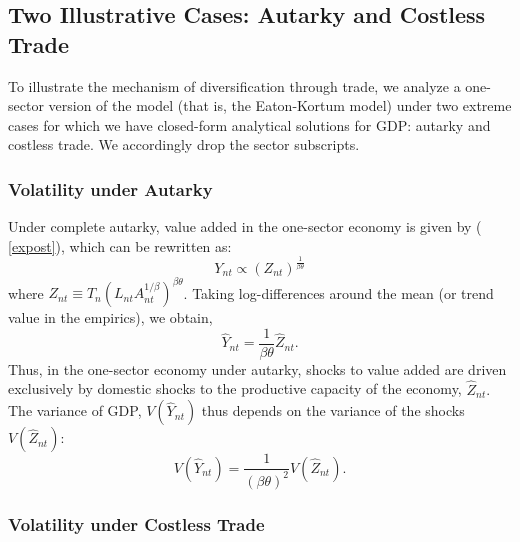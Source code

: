 \documentclass{article}
\begin{document}
\subsection{Two Illustrative Cases: Autarky and Costless Trade}

To illustrate the mechanism of diversification through trade, we analyze a
one-sector version of the model (that is, the Eaton-Kortum model) under two
extreme cases for which we have closed-form analytical solutions for GDP:
autarky and costless trade. We accordingly drop the sector subscripts.

\subsubsection{Volatility under Autarky}

Under complete autarky, value added in the one-sector economy is given by (%
\ref{expost}), which can be rewritten as: 
\begin{equation*}
Y_{nt}\propto \left( Z_{nt}\right) ^{\frac{1}{\beta \theta }} 
\end{equation*}
where $Z_{nt}\equiv T_{n}\left( L_{nt}A_{nt}^{1/\beta }\right)^{\beta\theta
} $. Taking log-differences around the mean (or trend value in the
empirics), we obtain, 
\begin{equation*}
\hat{Y}_{nt}=\frac{1}{\beta \theta }\hat{Z}_{nt}. 
\end{equation*}
Thus, in the one-sector economy under autarky, shocks to value added are
driven exclusively by domestic shocks to the productive capacity of the
economy, $\hat{Z}_{nt}.$ The variance of GDP, $V(\hat{Y}_{nt})$ thus depends
on the variance of the shocks $V(\hat{Z}_{nt})$: 
\begin{equation*}
V(\hat{Y}_{nt})=\frac{1}{\left( \beta \theta \right) ^{2}}V(\hat{Z}_{nt}). 
\end{equation*}

\subsubsection{Volatility under Costless Trade}
\end{document}
